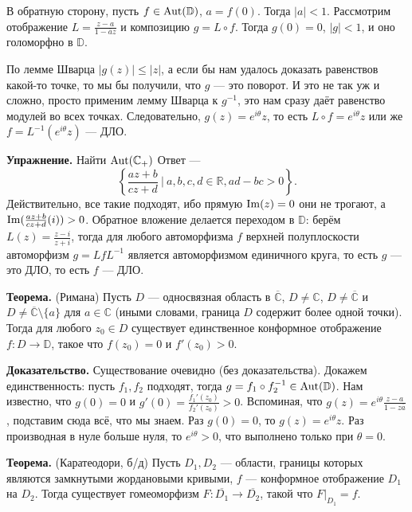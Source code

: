 В обратную сторону, пусть $f \in \operatorname{Aut}(\mathbb D)$, $a = f(0)$.
Тогда $|a| < 1$.
Рассмотрим отображение $L = \frac{z - a}{1 - \overline a z}$ и композицию $g = L \circ f$.
Тогда $g(0) = 0$, $|g| < 1$, и оно голоморфно в $\mathbb D$.

По лемме Шварца $|g(z)| \le |z|$, а если бы нам удалось доказать равенствов какой-то точке, то мы бы получили, что $g$ --- это поворот.
И это не так уж и сложно, просто применим лемму Шварца к $g^{-1}$, это нам сразу даёт равенство модулей во всех точках.
Следовательно, $g(z) = e^{i\theta} z$, то есть $L \circ f = e^{i\theta} z$ или же $f = L^{-1}(e^{i\theta} z)$ --- ДЛО.

\QED

\textbf{Упражнение.} Найти $\operatorname{Aut}(\mathbb C_+)$
Ответ ---
\[
    \left\{ \frac{az + b}{cz + d}~\bigg|~a, b, c, d \in \mathbb R, ad - bc > 0 \right\}.
\]
Действительно, все такие подходят, ибо прямую $\operatorname{Im}(z) = 0$ они не трогают, а $\operatorname{Im}( \frac{az + b}{cz + d}(i)) > 0$.
Обратное вложение делается переходом в $\mathbb D$: берём $L(z) = \frac{z - i}{z + i}$, тогда для любого автоморфизма $f$ верхней полуплоскости автоморфизм $g = L f L^{-1}$ является автоморфизмом единичного круга, то есть $g$ --- это ДЛО, то есть $f$ --- ДЛО.

\textbf{Теорема.} (Римана) Пусть $D$ --- односвязная область в $\overline{\mathbb C}$, $D \ne \mathbb C$, $D \ne \overline{\mathbb C}$ и $D \ne \overline{\mathbb C} \setminus \{a\}$ для $a \in \mathbb C$ (иными словами, граница $D$ содержит более одной точки).
Тогда для любого $z_0 \in D$ существует единственное конформное отображение $f: D \to \mathbb D$, такое что $f(z_0) = 0$ и $f'(z_0) > 0$.

\textbf{Доказательство.} Существование очевидно (без доказательства).
Докажем единственность: пусть $f_1, f_2$ подходят, тогда $g = f_1 \circ f_2^{-1} \in \operatorname{Aut}(\mathbb D)$.
Нам известно, что $g(0) = 0$ и $g'(0) = \frac{f_1'(z_0)}{f_2'(z_0)} > 0$.
Вспоминая, что $g(z) = e^{i\theta} \frac{z - a}{1 - z \overline a}$, подставим сюда всё, что мы знаем.
Раз $g(0) = 0$, то $g(z) = e^{i\theta} z$.
Раз производная в нуле больше нуля, то $e^{i\theta} > 0$, что выполнено только при $\theta = 0$.

\QED

\textbf{Теорема.} (Каратеодори, б/д) Пусть $D_1, D_2$ --- области, границы которых являются замкнутыми жордановыми кривыми, $f$ --- конформное отображение $D_1$ на $D_2$.
Тогда существует гомеоморфизм $F: \overline{D_1} \to \overline{D_2}$, такой что $F|_{D_1} = f$.

